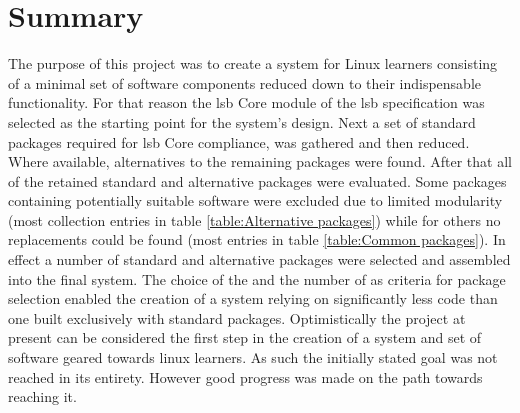 \section{Summary}\label{Summary}

The purpose of this project was to create a system for Linux learners consisting of a minimal set of software components reduced down to their indispensable functionality. For that reason the \gls{lsb} Core module of the \gls{lsb} specification was selected as the starting point for the system's design. Next a set of standard packages required for \gls{lsb} Core compliance, was gathered and then reduced. Where available, alternatives to the remaining packages were found. After that all of the retained standard and alternative packages were evaluated. Some packages containing potentially suitable software were excluded due to limited modularity (most collection entries in table \ref{table:Alternative packages}) while for others no replacements could be found (most entries in table \ref{table:Common packages}). In effect a number of standard and alternative packages were selected and assembled into the final system. The choice of the  and the number of  as criteria for package selection enabled the creation of a system relying on significantly less code than one built exclusively with standard packages. Optimistically the project at present can be considered the first step in the creation of a system and set of software geared towards linux learners. As such the initially stated goal was not reached in its entirety. However good progress was made on the path towards reaching it.
